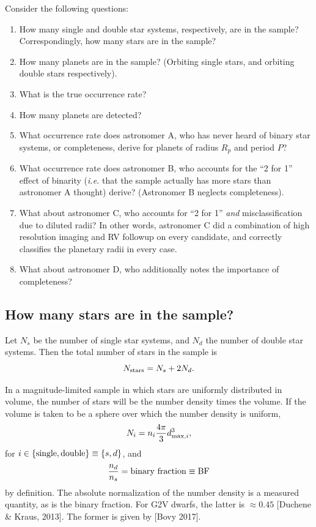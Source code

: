 \documentclass{emulateapj}
\begin{document}
Consider the following questions:
\begin{enumerate}
\item How many single and double star systems, respectively, are in the sample?
Correspondingly, how many stars are in the sample?

\item How many planets are in the sample? (Orbiting single stars, and orbiting 
double stars respectively).

\item What is the true occurrence rate?

\item How many planets are detected?

\item What occurrence rate does astronomer A, who has never heard of binary 
star systems, or completeness, derive for planets of radius $R_p$ and period 
$P$?

\item What occurrence rate does astronomer B, who accounts for the ``2 for 1'' 
effect of binarity (\textit{i.e.} that the sample actually has more stars than 
astronomer A thought) derive? (Astronomer B neglects completeness).

\item What about astronomer C, who accounts for ``2 for 1'' \textit{and} 
misclassification due to diluted radii? In other words, astronomer C did a 
combination of high resolution imaging and RV followup on every candidate, and
correctly classifies the planetary radii in every case.

\item What about astronomer D, who additionally notes the importance of 
completeness?
\end{enumerate}


\subsection{How many stars are in the sample?}

Let $N_s$ be the number of single star systems, and $N_d$ the number of double 
star systems. Then the total number of stars in the sample is
\begin{equation}
N_{\rm stars} = N_s + 2N_d.
\end{equation}

In a magnitude-limited sample in which stars are uniformly distributed in 
volume, the number of stars will be the number density times the volume.
If the volume is taken to be a sphere over which the number density is uniform,
\begin{equation}
N_i = n_{i} \frac{4\pi}{3} d_{{\rm max},i}^3,
\label{eq:number_systems}
\end{equation}
for $i\in{\rm \{single,double\} } \equiv { \{s,d\} }$, and
\begin{equation}
\frac{n_{d}}{n_{s}} = {\rm binary\ fraction} \equiv {\rm BF}
\end{equation}
by definition. The absolute normalization of the number density is a measured 
quantity, as is the binary fraction. For G2V dwarfs, the latter is $\approx 
0.45$ [Duchene \& Kraus, 2013]. The former is given by [Bovy 2017].
\end{document}
